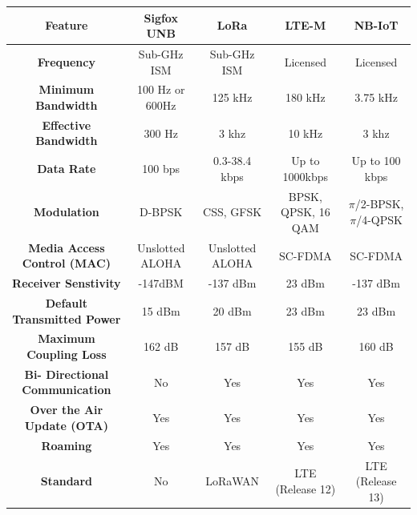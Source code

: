 \documentclass[12pt]{article}
\begin{document}
\begin{table}[H]
{\begin{tabular}{|c|c|c|c|c|}
Feature                                & Sigfox UNB      & LoRa            & LTE-M              & NB-IoT               \\ \hline
\textbf{Frequency}                     & Sub-GHz ISM     & Sub-GHz ISM     & Licensed           & Licensed             \\ \hline
\textbf{Minimum Bandwidth}             & 100 Hz or 600Hz & 125 kHz         & 180 kHz            & 3.75 kHz             \\ \hline
\textbf{Effective Bandwidth}           & 300 Hz          & 3 khz           & 10 kHz             & 3 khz                \\ \hline
\textbf{Data Rate}                     & 100 bps         & 0.3-38.4 kbps   & Up to 1000kbps     & Up to 100 kbps       \\ \hline
\textbf{Modulation}                    & D-BPSK          & CSS, GFSK       & BPSK, QPSK, 16 QAM & $\pi$/2-BPSK, $\pi$/4-QPSK \\ \hline
\textbf{Media Access Control (MAC)}    & Unslotted ALOHA & Unslotted ALOHA & SC-FDMA            & SC-FDMA              \\ \hline
\textbf{Receiver Senstivity}           & -147dBM         & -137 dBm        & 23 dBm             & -137 dBm             \\ \hline
\textbf{Default Transmitted Power}     & 15 dBm          & 20 dBm          & 23 dBm             & 23 dBm               \\ \hline
\textbf{Maximum Coupling Loss}         & 162 dB          & 157 dB          & 155 dB             & 160 dB               \\ \hline
\textbf{Bi- Directional Communication} & No              & Yes             & Yes                & Yes                  \\ \hline
\textbf{Over the Air Update (OTA)}     & Yes             & Yes             & Yes                & Yes                  \\ \hline
\textbf{Roaming}                       & Yes             & Yes             & Yes                & Yes                  \\ \hline
\textbf{Standard}                      & No              & LoRaWAN         & LTE (Release 12)   & LTE (Release 13)     \\ \hline
\end{tabular}}

\label{table:LPWAN comparison}
\end{table}

\end{document}
